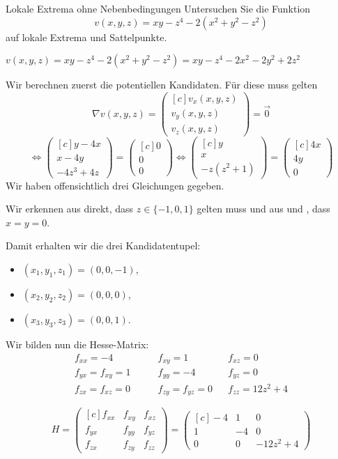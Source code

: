 \documentclass[german]{../spicker}
\newcommand{\vektor}[1]{\begin{pmatrix*}[c] #1 \end{pmatrix*}}
\begin{document}
\begin{example}{Lokale Extrema ohne Nebenbedingungen}
    Untersuchen Sie die Funktion
    $$
        v(x, y, z) = xy - z^4 -2(x^2 + y^2 -z^2)
    $$ auf lokale Extrema und Sattelpunkte.

    \noindent\makebox[\linewidth]{\rule{\textwidth}{1pt}}

    $v(x, y, z) = xy - z^4 -2(x^2 + y^2 -z^2) = xy - z^4 -2x^2 -2y^2 + 2z^2$

    Wir berechnen zuerst die potentiellen Kandidaten.
    Für diese muss gelten
    $$
        \nabla v(x, y, z) = \vektor{v_x(x, y, z)      \\ v_y(x, y, z)\\ v_z(x, y, z)} = \vec{0}
    $$
    $$
        \iff \vektor{ y -4x \\ x -4y \\ -4z^3 +4z} = \vektor{0 \\ 0 \\ 0} \iff \vektor{y \\ x \\ -z(z^2 +1)} = \vektor{4x \\ 4y \\ 0}
    $$
    Wir haben offensichtlich drei Gleichungen gegeben.

    Wir erkennen aus  direkt, dass $z \in \{-1, 0, 1\}$ gelten muss und aus  und , dass $x = y = 0$.

    Damit erhalten wir die drei Kandidatentupel:
    \begin{itemize}
        \item $(x_1, y_1, z_1) = (0, 0, -1)$,
        \item $(x_2, y_2, z_2) = (0, 0, 0)$,
        \item $(x_3, y_3, z_3) = (0, 0, 1)$.
    \end{itemize}

    Wir bilden nun die Hesse-Matrix:
    $$
        \begin{aligned}
            f_{xx} = -4 \qquad         & f_{xy} = 1          &  & f_{xz} = 0         \\
            f_{yx} = f_{xy} = 1 \qquad & f_{yy} = -4         &  & f_{yz} = 0         \\
            f_{zx} = f_{xz} = 0 \qquad & f_{zy} = f_{yz} = 0 &  & f_{zz} = 12z^2 + 4
        \end{aligned}
    $$

    $$
        H = \vektor{f_{xx} & f_{xy} & f_{xz} \\ f_{yx} & f_{yy} & f_{yz} \\ f_{zx} & f_{zy} & f_{zz}} = \vektor{-4 & 1 & 0 \\ 1 & -4 & 0 \\ 0 & 0 & -12z^2 + 4}
    $$


\end{example}
\end{document}
